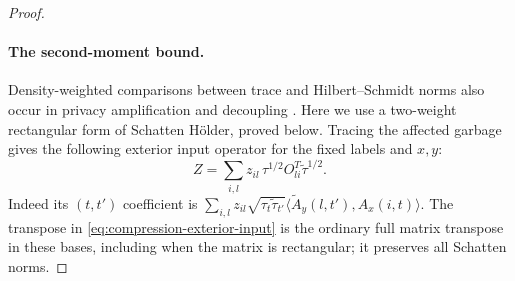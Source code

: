 \begin{proof}
\paragraph{The second-moment bound.}
Density-weighted comparisons between trace and Hilbert--Schmidt norms
also occur in privacy amplification and decoupling
\cite[Lemma~5.1.3]{Renner2005Security} \cite[Lemma~3.7]{DupuisBertaWullschlegerRenner2014}.
Here we use a two-weight rectangular form of Schatten H\"older, proved below.
Tracing the affected garbage gives the following exterior input
operator for the fixed labels and $x,y$:
\begin{equation}
 Z=\sum_{i,l}z_{il}\,
          \tau^{1/2}O_{li}^{T}\widetilde\tau^{1/2}.
 \label{eq:compression-exterior-input}
\end{equation}
Indeed its $(t,t')$ coefficient is
$\sum_{i,l}z_{il}\sqrt{\tau_t\widetilde\tau_{t'}}
       \langle\widetilde A_y(l,t'),A_x(i,t)\rangle$.
The transpose in \eqref{eq:compression-exterior-input} is the ordinary
full matrix transpose in these bases, including when the matrix is
rectangular; it preserves all Schatten norms.


\end{proof}
